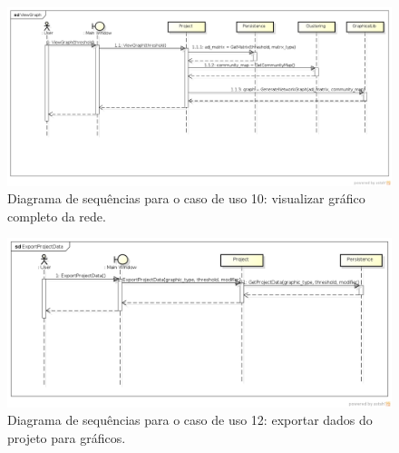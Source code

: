 \begin{figure}
\centering
\includegraphics[scale=0.41]{view-graph}
\caption{Diagrama de sequências para o caso de uso 10: visualizar gráfico completo da rede.}
\label{fig:view-graph}
\end{figure}

\begin{figure}
\centering
\includegraphics[scale=0.43]{export-project-data}
\caption{Diagrama de sequências para o caso de uso 12: exportar dados do projeto para gráficos.}
\label{fig:export-project-data}
\end{figure}